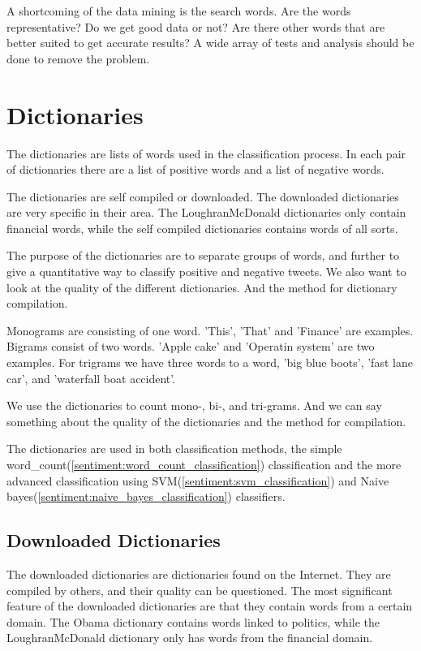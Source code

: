 A shortcoming of the data mining is the search words. Are the words
representative? Do we get good data or not? Are there other words that are
better suited to get accurate results? A wide array of tests and analysis should
be done to remove the problem. 
%

\section{Dictionaries}\label{data:dictionaries}

The dictionaries are lists of words used in the classification process. In each
pair of dictionaries there are a list of positive words and a list of negative
words.

The dictionaries are self compiled or downloaded. The downloaded dictionaries
are very specific in their area. The LoughranMcDonald dictionaries only contain
financial words, while the self compiled dictionaries contains words of all
sorts. 

The purpose of the dictionaries are to separate groups of words, and
further to give a quantitative way to classify positive and negative tweets.
We also want to look at the quality of the different dictionaries. And the
method for dictionary compilation.  

Monograms are consisting of one word. 'This', 'That' and 'Finance' are
examples. Bigrams consist of two words. 'Apple cake' and
'Operatin system' are two examples. For trigrams we have three words to a word,
'big blue boots', 'fast lane car', and 'waterfall boat accident'. 

We use the dictionaries to count mono-, bi-, and tri-grams.
And we can say something about the quality of the dictionaries and the method
for compilation.

The dictionaries are used in both classification methods, the simple
word\_count(\ref{sentiment:word_count_classification}) classification and the
more advanced classification using SVM(\ref{sentiment:svm_classification}) and
Naive bayes(\ref{sentiment:naive_bayes_classification}) classifiers. 
%

\subsection{Downloaded Dictionaries}
The downloaded dictionaries are dictionaries found on the Internet. They are
compiled by others, and their quality can be questioned. The most significant
feature of the downloaded dictionaries are that they contain words from a
certain domain. The Obama dictionary contains words linked to politics,
while the LoughranMcDonald dictionary only has words from the financial domain.  

